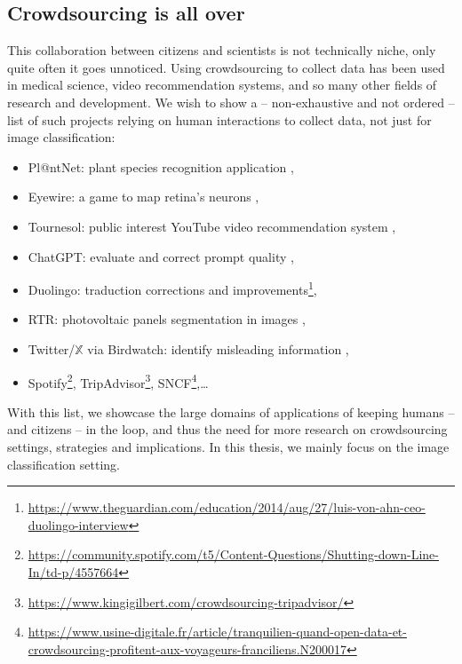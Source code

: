 \subsection{Crowdsourcing is all over}

This collaboration between citizens and scientists is not technically niche, only quite often it goes unnoticed.
Using crowdsourcing to collect data has been used in medical science, video recommendation systems, and so many other fields of research and development.
We wish to show a -- non-exhaustive and not ordered -- list of such projects relying on human interactions to collect data, not just for image classification:
\begin{itemize}
    \item Pl@ntNet: plant species recognition application \citep{plantet},
    \item Eyewire: a game to map retina's neurons \citep{tinati2017investigation},
    \item Tournesol: public interest YouTube video recommendation system \citep{hoang2021tournesol},
    \item ChatGPT: evaluate and correct prompt quality \citep{openai2023gpt4},
    \item Duolingo: traduction corrections and improvements\footnote{\url{https://www.theguardian.com/education/2014/aug/27/luis-von-ahn-ceo-duolingo-interview}},
    \item RTR: photovoltaic panels segmentation in images \citep{kasmi2023crowdsourced},
    \item Twitter/$\mathbb{X}$ via Birdwatch: identify misleading information \citep{wojcik2022birdwatch},
    \item Spotify\footnote{\url{https://community.spotify.com/t5/Content-Questions/Shutting-down-Line-In/td-p/4557664}}, TripAdvisor\footnote{\url{https://www.kingigilbert.com/crowdsourcing-tripadvisor/}}, SNCF\footnote{\url{https://www.usine-digitale.fr/article/tranquilien-quand-open-data-et-crowdsourcing-profitent-aux-voyageurs-franciliens.N200017}},\dots
\end{itemize}

With this list, we showcase the large domains of applications of keeping humans -- and citizens -- in the loop, and thus the need for more research on crowdsourcing settings, strategies and implications.
In this thesis, we mainly focus on the image classification setting.


